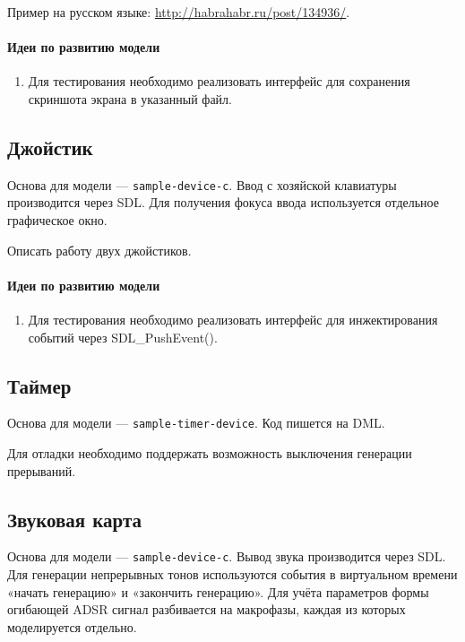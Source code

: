 Пример на русском языке: \url{http://habrahabr.ru/post/134936/}.

\paragraph{Идеи по развитию модели}
\begin{enumerate}
\item Для тестирования необходимо реализовать интерфейс для сохранения скриншота экрана в указанный файл.
\end{enumerate}

\subsection{Джойстик}

Основа для модели --- \texttt{sample-device-c}. Ввод с хозяйской клавиатуры производится через SDL. Для получения фокуса ввода используется отдельное графическое окно.

\todo Описать работу двух джойстиков.

\paragraph{Идеи по развитию модели}
\begin{enumerate}
\item Для тестирования необходимо реализовать интерфейс для инжектирования событий через SDL_PushEvent().                                                                                                   \end{enumerate}


\subsection{Таймер}

Основа для модели --- \texttt{sample-timer-device}. Код пишется на DML.

Для отладки необходимо поддержать возможность выключения генерации прерываний.

\subsection{Звуковая карта}

Основа для модели --- \texttt{sample-device-c}. Вывод звука производится через SDL. Для генерации непрерывных тонов используются события в виртуальном времени «начать генерацию» и «закончить генерацию». Для учёта параметров формы огибающей ADSR сигнал разбивается на макрофазы, каждая из которых моделируется отдельно.

